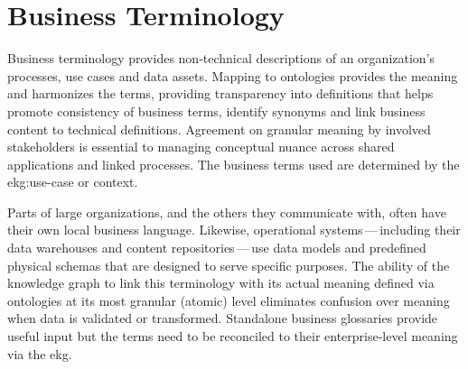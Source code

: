 \section{Business Terminology}%
\label{sec:ekg-mm-b-2-4}
\label{sec:ekg-mm-business-terminology}

Business terminology provides non-technical descriptions of an organization’s processes, use cases and data assets.
Mapping to ontologies provides the meaning and harmonizes the terms,
providing transparency into definitions that helps promote consistency of business terms,
identify synonyms and link business content to technical definitions.
Agreement on granular meaning by involved stakeholders is essential to managing conceptual nuance across
shared applications and linked processes.
The business terms used are determined by the \gls{ekg:use-case} or context.

\ekgmmContextSection

Parts of large organizations, and the others they communicate with, often have their own local business language.
Likewise, operational systems\,---\,including their data warehouses and content repositories\,---\,use
data models and predefined physical schemas that are designed to serve specific purposes.
The ability of the knowledge graph to link this terminology with its actual meaning defined via ontologies at
its most granular (atomic) level eliminates confusion over meaning when data is validated
or transformed.
Standalone business glossaries provide useful input but the terms need to be reconciled to their
enterprise-level meaning via the \gls{ekg}.

\kgmmcorequestionssection

%
%

